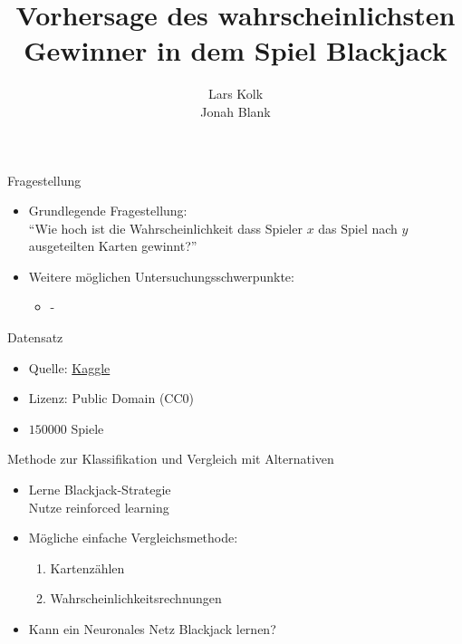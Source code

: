 \documentclass[aspectratio=1610, 9pt]{beamer}
\title{Vorhersage des wahrscheinlichsten Gewinner in dem Spiel Blackjack}
\author[L.~Kolk,~J.~Blank]{Lars Kolk\\ Jonah Blank}
\institute[ML-Seminar]{\\[0.3cm]TU Dortmund \\ \Large ML-Seminar}
\begin{document}
\maketitle


\begin{frame}{Fragestellung}
\begin{itemize}
  \item Grundlegende Fragestellung:\\
  \rightarrow{} ``Wie hoch ist die Wahrscheinlichkeit dass Spieler $x$ das Spiel nach $y$ ausgeteilten Karten gewinnt?''
  \vspace{0.5cm}
  \item Weitere möglichen Untersuchungsschwerpunkte:
  \begin{itemize}
    \item -
  \end{itemize}
\end{itemize}



\end{frame}


\begin{frame}{Datensatz}
    \begin{itemize}
    \item Quelle: \href{https://www.kaggle.com/mojocolors/900000-hands-of-blackjack-results}{Kaggle}
    \item Lizenz: Public Domain (CC0)
    \item $150000$ Spiele
    \end{itemize}
\end{frame}

\begin{frame}{Methode zur Klassifikation und Vergleich mit Alternativen}
  \begin{itemize}
    \item Lerne Blackjack-Strategie \\
    \rightarrow{} Nutze reinforced learning\\
    \item Mögliche einfache Vergleichsmethode:
    \begin{enumerate}
      \item Kartenzählen
      \item Wahrscheinlichkeitsrechnungen
    \end{enumerate}
    \item Kann ein Neuronales Netz Blackjack lernen?
  \end{itemize}

\end{frame}
\end{document}
